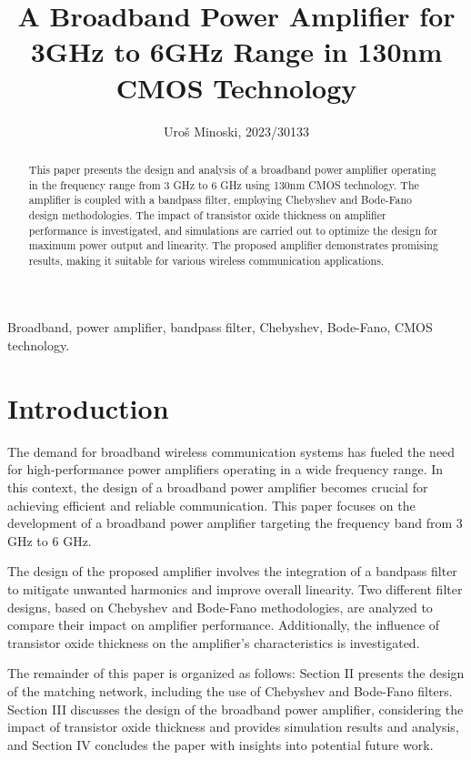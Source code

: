 \documentclass[lettersize,journal]{IEEEtran}
\begin{document}
\title{A Broadband Power Amplifier for 3GHz to 6GHz
Range in 130nm CMOS Technology}
\author{Uroš Minoski, 2023/30133}

\maketitle

\begin{abstract}
This paper presents the design and analysis of a broadband power amplifier operating in the frequency range from 3 GHz to 6 GHz using 130nm CMOS technology. The amplifier is coupled with a bandpass filter, employing Chebyshev and Bode-Fano design methodologies. The impact of transistor oxide thickness on amplifier performance is investigated, and simulations are carried out to optimize the design for maximum power output and linearity. The proposed amplifier demonstrates promising results, making it suitable for various wireless communication applications.
\end{abstract}

\begin{IEEEkeywords}
Broadband, power amplifier, bandpass filter, Chebyshev, Bode-Fano, CMOS technology.
\end{IEEEkeywords}

\section{Introduction}
The demand for broadband wireless communication systems has fueled the need for high-performance power amplifiers operating in a wide frequency range. In this context, the design of a broadband power amplifier becomes crucial for achieving efficient and reliable communication. This paper focuses on the development of a broadband power amplifier targeting the frequency band from 3 GHz to 6 GHz.


The design of the proposed amplifier involves the integration of a bandpass filter to mitigate unwanted harmonics and improve overall linearity. Two different filter designs, based on Chebyshev and Bode-Fano methodologies, are analyzed to compare their impact on amplifier performance. Additionally, the influence of transistor oxide thickness on the amplifier's characteristics is investigated.

The remainder of this paper is organized as follows: Section II presents the design of the matching network, including the use of Chebyshev and Bode-Fano filters. Section III discusses the design of the broadband power amplifier, considering the impact of transistor oxide thickness and provides simulation results and analysis, and Section IV concludes the paper with insights into potential future work.
\end{document}
